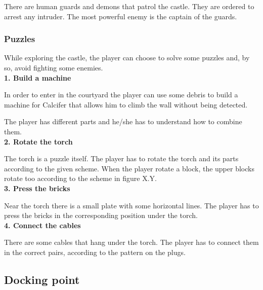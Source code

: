 There are human guards and demons that patrol the castle. They are ordered to arrest any intruder. The most powerful enemy is the captain of the guards.

\subsubsection{Puzzles}
While exploring the castle, the player can choose to solve some puzzles and, by so, avoid fighting some enemies. \\

\textbf{1. Build a machine}

In order to enter in the courtyard the player can use some debris to build a machine for Calcifer that allows him to climb the wall without being detected.

The player has different parts and he/she has to understand how to combine them.\\

\textbf{2. Rotate the torch}

The torch is a puzzle itself. The player has to rotate the torch and its parts according to the given scheme. When the player rotate a block, the upper blocks rotate too according to the scheme in figure X.Y.\\

\textbf{3. Press the bricks}

Near the torch there is a small plate with some horizontal lines. The player has to press the bricks in the corresponding position under the torch.\\

\textbf{4. Connect the cables}

There are some cables that hang under the torch. The player has to connect them in the correct pairs, according to the pattern on the plugs.

\subsection{Docking point}

